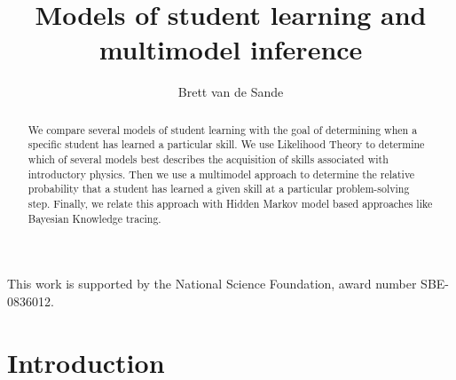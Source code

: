 \documentclass[prodmode,acmtecs]{acmsmall}
\begin{document}

\title{Models of student learning and multimodel inference}
\author{Brett van de Sande
}

%

\begin{abstract}
We compare several models of student learning with the goal of 
determining when a specific student has learned a particular skill.  
We use Likelihood Theory to determine
which of several models best describes the acquisition
of skills associated with introductory physics.  Then we
use a multimodel approach to determine the relative probability
that a student has learned a given skill at a particular 
problem-solving step.  Finally, we relate this
approach with Hidden Markov model based approaches like
Bayesian Knowledge tracing.
\end{abstract}





\begin{bottomstuff}
This work is supported by the National Science Foundation, award
number SBE-0836012.
\end{bottomstuff}


\maketitle


\section{Introduction}

\end{document}
